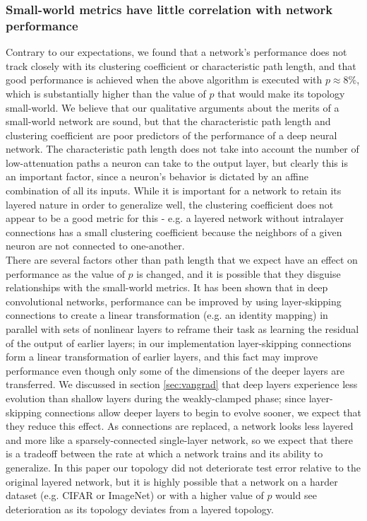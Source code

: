 \documentclass[format=sigconf]{acmart}
\newcommand{\npar}{\\\indent}
\begin{document}
\subsubsection{Small-world metrics have little correlation with network performance}
Contrary to our expectations, we found that a network's performance does not track closely with its clustering coefficient or characteristic path length, and that good performance is achieved when the above algorithm is executed with $p\approx 8\%$, which is substantially higher than the value of $p$ that would make its topology small-world. We believe that our qualitative arguments about the merits of a small-world network are sound, but that the characteristic path length and clustering coefficient are poor predictors of the performance of a deep neural network. The characteristic path length does not take into account the number of low-attenuation paths a neuron can take to the output layer, but clearly this is an important factor, since a neuron's behavior is dictated by an affine combination of all its inputs. While it is important for a network to retain its layered nature in order to generalize well, the clustering coefficient does not appear to be a good metric for this - e.g. a layered network without intralayer connections has a small clustering coefficient because the neighbors of a given neuron are not connected to one-another.
\npar
There are several factors other than path length that we expect have an effect on performance as the value of $p$ is changed, and it is possible that they disguise relationships with the small-world metrics. It has been shown \cite{he2015} that in deep convolutional networks, performance can be improved by using layer-skipping connections to create a linear transformation (e.g. an identity mapping) in parallel with sets of nonlinear layers to reframe their task as learning the residual of the output of earlier layers; in our implementation layer-skipping connections form a linear transformation of earlier layers, and this fact may improve performance even though only some of the dimensions of the deeper layers are transferred. We discussed in section \ref{sec:vangrad} that deep layers experience less evolution than shallow layers during the weakly-clamped phase; since layer-skipping connections allow deeper layers to begin to evolve sooner, we expect that they reduce this effect. As connections are replaced, a network looks less layered and more like a sparsely-connected single-layer network, so we expect that there is a tradeoff between the rate at which a network trains and its ability to generalize. In this paper our topology did not deteriorate test error relative to the original layered network, but it is highly possible that a network on a harder dataset (e.g. CIFAR or ImageNet) or with a higher value of $p$ would see deterioration as its topology deviates from a layered topology.
\end{document}

